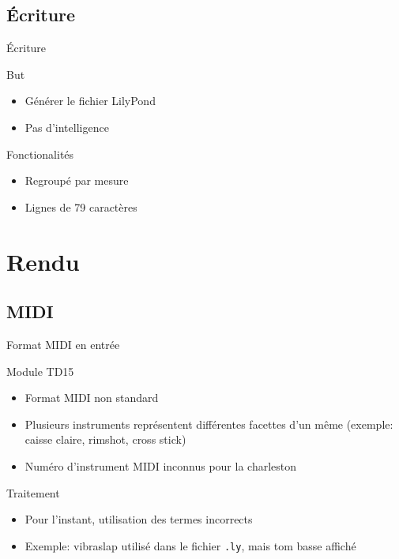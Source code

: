 \documentclass{beamer}
\begin{document}
\subsection{Écriture}

\begin{frame}{Écriture}
    \begin{block}{But}
        \begin{itemize}
            \item Générer le fichier LilyPond
            \item Pas d’intelligence
        \end{itemize}
    \end{block}
    \begin{block}{Fonctionalités}
        \begin{itemize}
            \item Regroupé par mesure
            \item Lignes de 79 caractères
        \end{itemize}
    \end{block}
\end{frame}

\section{Rendu}

\subsection{MIDI}

\begin{frame}[containsverbatim]{Format MIDI en entrée}
    \begin{block}{Module TD15}
        \begin{itemize}
            \item Format MIDI non standard
            \item Plusieurs instruments représentent différentes facettes
                d’un même (exemple: caisse claire, rimshot, cross stick)
            \item Numéro d’instrument MIDI inconnus pour la charleston
        \end{itemize}
    \end{block}
    \begin{block}{Traitement}
        \begin{itemize}
            \item Pour l’instant, utilisation des termes incorrects
            \item Exemple: vibraslap utilisé dans le fichier \verb+.ly+, mais
                tom basse affiché
        \end{itemize}
    \end{block}
\end{frame}
\end{document}
